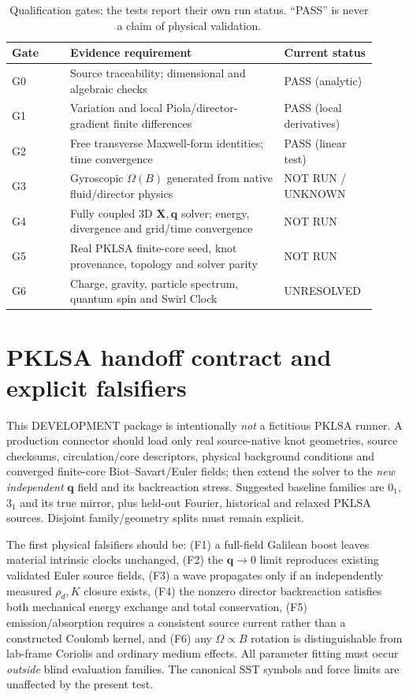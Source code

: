\documentclass[11pt,a4paper]{article}
\newcommand{\rhoD}{\rho_{\!d}}
\newcommand{\XX}{\mathbf X}
\newcommand{\qq}{\mathbf q}
\begin{document}
\begin{table}[h]
\caption{Qualification gates; the tests report their own run status. ``PASS'' is never a claim of physical validation.}
\begin{tabular}{P{0.15\linewidth}P{0.55\linewidth}P{0.22\linewidth}}
Gate & Evidence requirement & Current status\\ \hline
G0 & Source traceability; dimensional and algebraic checks & PASS (analytic)\\
G1 & Variation and local Piola/director-gradient finite differences & PASS (local derivatives)\\
G2 & Free transverse Maxwell-form identities; time convergence & PASS (linear test)\\
G3 & Gyroscopic $\Omega(B)$ generated from native fluid/director physics & NOT RUN / UNKNOWN\\
G4 & Fully coupled 3D $\XX,\qq$ solver; energy, divergence and grid/time convergence & NOT RUN\\
G5 & Real PKLSA finite-core seed, knot provenance, topology and solver parity & NOT RUN\\
G6 & Charge, gravity, particle spectrum, quantum spin and Swirl Clock & UNRESOLVED\\
\end{tabular}
\end{table}

\section{PKLSA handoff contract and explicit falsifiers}
This DEVELOPMENT package is intentionally \emph{not} a fictitious PKLSA runner. A production connector should load only real source-native knot geometries, source checksums, circulation/core descriptors, physical background conditions and converged finite-core Biot--Savart/Euler fields; then extend the solver to the \emph{new independent} $\qq$ field and its backreaction stress. Suggested baseline families are $0_1$, $3_1$ and its true mirror, plus held-out Fourier, historical and relaxed PKLSA sources. Disjoint family/geometry splits must remain explicit.

The first physical falsifiers should be: (F1) a full-field Galilean boost leaves material intrinsic clocks unchanged, (F2) the $\qq\to0$ limit reproduces existing validated Euler source fields, (F3) a wave propagates only if an independently measured $\rhoD,K$ closure exists, (F4) the nonzero director backreaction satisfies both mechanical energy exchange and total conservation, (F5) emission/absorption requires a consistent source current rather than a constructed Coulomb kernel, and (F6) any $\Omega\propto B$ rotation is distinguishable from lab-frame Coriolis and ordinary medium effects. All parameter fitting must occur \emph{outside} blind evaluation families. The canonical SST symbols and force limits are unaffected by the present test.
\end{document}
